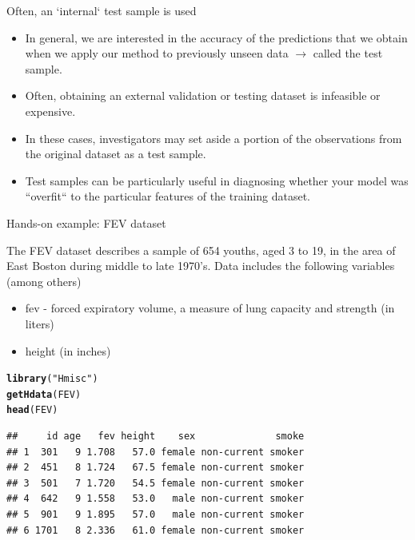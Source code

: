 \documentclass[table]{beamer}\usepackage[]{graphicx}\usepackage[]{color}
\makeatletter
\newcommand{\hlstr}[1]{\textcolor[rgb]{0.192,0.494,0.8}{#1}}%
\newcommand{\hlstd}[1]{\textcolor[rgb]{0.345,0.345,0.345}{#1}}%
\newcommand{\hlkwd}[1]{\textcolor[rgb]{0.737,0.353,0.396}{\textbf{#1}}}%
\newenvironment{kframe}{%
 \def\at@end@of@kframe{}%
 \ifinner\ifhmode%
  \def\at@end@of@kframe{\end{minipage}}%
  \begin{minipage}{\columnwidth}%
 \fi\fi%
 \def\FrameCommand##1{\hskip\@totalleftmargin \hskip-\fboxsep
 \colorbox{shadecolor}{##1}\hskip-\fboxsep
     \hskip-\linewidth \hskip-\@totalleftmargin \hskip\columnwidth}%
 \MakeFramed {\advance\hsize-\width
   \@totalleftmargin\z@ \linewidth\hsize
   \@setminipage}}%
 {\par\unskip\endMakeFramed%
 \at@end@of@kframe}
\newenvironment{knitrout}{}{} %
\makeatother
\begin{document}

\begin{frame}{Often, an `internal` test sample is used}
\begin{itemize}
  \item In general, we are interested in the accuracy of the predictions that we obtain when we apply our method to previously unseen data $\rightarrow$  called the {\color{violet} test sample}. \\
  \item Often, obtaining an external validation or testing dataset is infeasible or expensive.
  \item In these cases, investigators may set aside a portion of the observations from the original dataset as a {\color{violet} test sample}.
  \item Test samples can be particularly useful in diagnosing whether your model was ``overfit`` to the particular features of the training dataset.
\end{itemize}
\end{frame}



\begin{frame}[fragile]{Hands-on example: FEV dataset}

The FEV dataset describes a sample of 654 youths, aged 3 to 19, in the area of East Boston during middle to late 1970's. Data includes the following variables (among others)

\begin{itemize}
  \item fev - forced expiratory volume, a measure of lung capacity and strength (in liters)
  \item height (in inches)
\end{itemize}

\scriptsize
\begin{knitrout}\footnotesize
{}\color{fgcolor}\begin{kframe}
\begin{alltt}
\hlkwd{library}\hlstd{(}\hlstr{"Hmisc"}\hlstd{)}
\hlkwd{getHdata}\hlstd{(FEV)}
\hlkwd{head}\hlstd{(FEV)}
\end{alltt}
\begin{verbatim}
##     id age   fev height    sex              smoke
## 1  301   9 1.708   57.0 female non-current smoker
## 2  451   8 1.724   67.5 female non-current smoker
## 3  501   7 1.720   54.5 female non-current smoker
## 4  642   9 1.558   53.0   male non-current smoker
## 5  901   9 1.895   57.0   male non-current smoker
## 6 1701   8 2.336   61.0 female non-current smoker
\end{verbatim}
\end{kframe}
\end{knitrout}

\end{frame}
\end{document}
